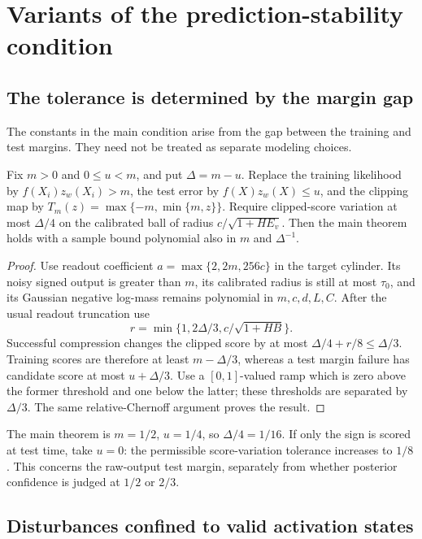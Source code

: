 \section{Variants of the prediction-stability condition}
\label{sec:theory-variants}

\subsection{The tolerance is determined by the margin gap}

The constants in the main condition arise from the gap between the training
and test margins. They need not be treated as separate modeling choices.

\begin{corollary}
\label{cor:general-margin-gap}
Fix $m>0$ and $0\le u<m$, and put $\Delta=m-u$.
Replace the training likelihood by $f(X_i)z_w(X_i)>m$, the test error by
$f(X)z_w(X)\le u$, and the clipping map by
$T_m(z)=\max\{-m,\min\{m,z\}\}$.
Require clipped-score variation at most $\Delta/4$ on the calibrated ball
of radius $c/\sqrt{1+HE_v}$. Then the main theorem holds with a sample
bound polynomial also in $m$ and $\Delta^{-1}$.
\end{corollary}
\begin{proof}
Use readout coefficient $a=\max\{2,2m,256c\}$ in the target cylinder.
Its noisy signed output is greater than $m$, its calibrated radius is still
at most $\tau_0$, and its Gaussian negative log-mass remains polynomial
in $m,c,d,L,C$. After the usual readout truncation use
\[
 r=\min\{1,2\Delta/3,c/\sqrt{1+HB}\}.
\]
Successful compression changes the clipped score by at most
$\Delta/4+r/8\le\Delta/3$.
Training scores are therefore at least $m-\Delta/3$, whereas a test
margin failure has candidate score at most $u+\Delta/3$.
Use a $[0,1]$-valued ramp which is zero above the former threshold and
one below the latter; these thresholds are separated by $\Delta/3$.
The same relative-Chernoff argument proves the result.
\end{proof}

The main theorem is $m=1/2$, $u=1/4$, so $\Delta/4=1/16$.
If only the sign is scored at test time, take $u=0$: the permissible
score-variation tolerance increases to $1/8$. This concerns the raw-output
test margin, separately from whether posterior confidence is judged at
$1/2$ or $2/3$.

\subsection{Disturbances confined to valid activation states}

